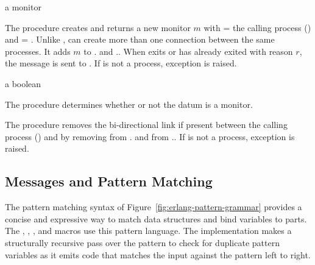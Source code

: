 \begin{procedure}
\end{procedure}
\returns{} a monitor

The  procedure creates and returns a new monitor $m$
with  = the calling process () and
 = .  Unlike ,
 can create more than one connection between the same
processes.  It adds $m$ to . and
..  When  exits or has
already exited with reason $r$, the message  is sent to .  If  is not
a process, exception  is
raised.

\begin{procedure}
\end{procedure}
\returns{} a boolean

The  procedure determines whether or not the datum
 is a monitor.

\begin{procedure}
\end{procedure}
\returns{} 

The  procedure removes the bi-directional link if
present between the calling process () and  by
removing  from . and
 from ..  If  is not
a process, exception  is
raised.

\subsection {Messages and Pattern Matching}

The pattern matching syntax of Figure~\ref{fig:erlang-pattern-grammar}
provides a concise and expressive way to match data structures and
bind variables to parts. The , ,
, and
 macros use this pattern language. The
implementation makes a structurally recursive pass over the
pattern to check for duplicate pattern variables as it emits
code that matches the input against the pattern left to right.

